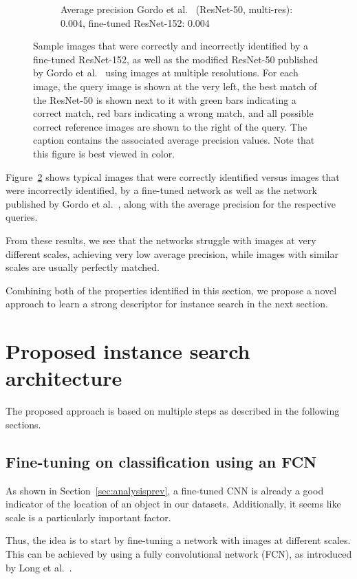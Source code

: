 \begin{figure}
\begin{subfigure}{\textwidth}
{Average precision Gordo et al.~\cite{gordo_deep_2016} (ResNet-50, multi-res): 0.004,
fine-tuned ResNet-152: 0.004
\label{fig:incorrect11C}}
\end{subfigure}
\caption{Sample images that were correctly and incorrectly identified
by a fine-tuned ResNet-152, as well as the modified ResNet-50 published by
Gordo et al.~\cite{gordo_deep_2016} using images at multiple resolutions. For each image,
the query image is shown at the very left, the best match of the ResNet-50 is shown next to it with green bars indicating a correct match, red bars indicating a wrong match, and all possible correct reference
images are shown to the right of the query. The caption contains the
associated average precision values.
Note that this figure is best viewed in color.
\label{fig:incorrectimg}}
\end{figure}

Figure~\ref{fig:incorrectimg}
shows typical images that were correctly identified versus images that
were incorrectly identified, by a fine-tuned network as well as the network
published by Gordo et al.~\cite{gordo_deep_2016}, along with the average
precision for the respective queries.

From these results, we see that the networks struggle with images at
very different scales, achieving very low average precision,
while images with similar scales are usually perfectly matched.

Combining both of the properties identified in this section, we
propose a novel approach to learn a strong descriptor for instance
search in the next section.

\section{Proposed instance search architecture}\label{sec:proposed}
The proposed approach is based on multiple steps as described in the
following sections.

\subsection{Fine-tuning on classification using an FCN}\label{sec:fcnfinetune}
As shown in Section~\ref{sec:analysisprev}, a fine-tuned CNN is already
a good indicator of the location of an object in our datasets.
Additionally, it seems like scale is a particularly important factor.

Thus, the idea is to start by fine-tuning a network with images
at different scales. This can be achieved by using a fully
convolutional network (FCN), as introduced by
Long et al.~\cite{long_fully_2015}.

